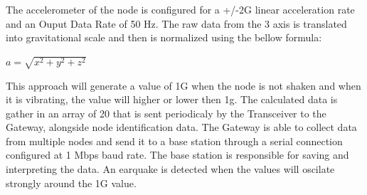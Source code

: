The accelerometer of the node is configured for a +/-2G linear acceleration rate and an Ouput Data Rate of 50 Hz. The raw data from the 3 axis is translated into gravitational scale and then is normalized using the bellow formula:

$ a = \sqrt{x^2+y^2+z^2}$

This approach will generate a value of 1G when the node is not shaken and when it is vibrating, the value will higher or lower then 1g. The calculated data is gather in an array of 20 that is sent periodicaly by the Transceiver to the Gateway, alongside node identification data. The Gateway is able to collect data from multiple nodes and send it to a base station through a serial connection configured at 1 Mbps baud rate. The base station is responsible for saving and interpreting the data. An earquake is detected when the values will oscilate strongly around the 1G value.



